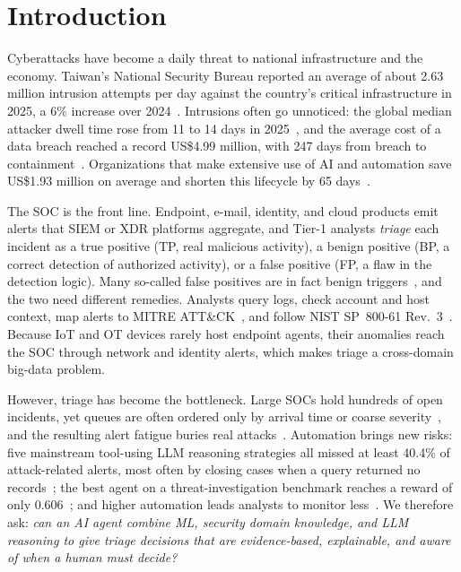 \documentclass[conference]{IEEEtran}
\begin{document}
\section{Introduction}\label{sec:intro}

Cyberattacks have become a daily threat to national infrastructure and
the economy. Taiwan's National Security Bureau reported an average of
about 2.63 million intrusion attempts per day against the country's
critical infrastructure in 2025, a 6\% increase over 2024~\cite{nsb2026}.
Intrusions often go unnoticed: the global median attacker dwell time
rose from 11 to 14 days in 2025~\cite{mtrends2026}, and the average
cost of a data breach reached a record US\$4.99 million, with 247 days
from breach to containment~\cite{ibm2026}. Organizations that make
extensive use of AI and automation save US\$1.93 million on average and
shorten this lifecycle by 65 days~\cite{ibm2026}.

The SOC is the front line. Endpoint, e-mail, identity, and cloud
products emit alerts that SIEM or XDR platforms aggregate, and Tier-1
analysts \emph{triage} each incident as a true positive (TP, real
malicious activity), a benign positive (BP, a correct detection of
authorized activity), or a false positive (FP, a flaw in the detection
logic). Many so-called false positives are in fact benign
triggers~\cite{alahmadi2022}, and the two need different remedies.
Analysts query logs, check account and host context, map alerts to
MITRE ATT\&CK~\cite{strom2018}, and follow NIST SP~800-61
Rev.~3~\cite{nist80061r3}. Because IoT and OT devices rarely host
endpoint agents, their anomalies reach the SOC through network and
identity alerts, which makes triage a cross-domain big-data problem.

However, triage has become the bottleneck. Large SOCs hold hundreds of
open incidents, yet queues are often ordered only by arrival time or
coarse severity~\cite{freitas2026aip}, and the resulting alert fatigue
buries real attacks~\cite{ndichu2026,habibzadeh2025}. Automation brings
new risks: five mainstream tool-using LLM reasoning strategies all
missed at least 40.4\% of attack-related alerts, most often by closing
cases when a query returned no records~\cite{tsegai2026}; the best agent
on a threat-investigation benchmark reaches a reward of only
0.606~\cite{wu2025excytin}; and higher automation leads analysts to
monitor less~\cite{tilbury2026}. We therefore ask: \emph{can an AI agent
combine ML, security domain knowledge, and LLM reasoning to give triage
decisions that are evidence-based, explainable, and aware of when a
human must decide?}
\end{document}
